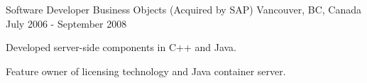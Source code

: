 \begin{cventries}
  \cventry
    {Software Developer} %
    {Business Objects (Acquired by SAP)} %
    {Vancouver, BC, Canada} %
    {July 2006 - September 2008} %
    {
      \begin{cvitems} %
        \item {Developed server-side components in C++ and Java.}
        \item {Feature owner of licensing technology and Java container server.}
      \end{cvitems}
    }

\end{cventries}
